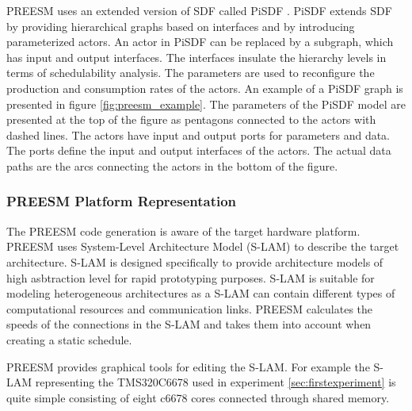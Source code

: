 PREESM uses an extended version of SDF called PiSDF \cite{pelcat2014preesm}. PiSDF extends SDF by providing hierarchical graphs based on interfaces and by introducing parameterized actors. An actor in PiSDF can be replaced by a subgraph, which has input and output interfaces. The interfaces insulate the hierarchy levels in terms of schedulability analysis. The parameters are used to reconfigure the production and consumption rates of the actors. \cite{desnos2013pimm} An example of a PiSDF graph is presented in figure \ref{fig:preesm_example}. The parameters of the PiSDF model are presented at the top of the figure as pentagons connected to the actors with dashed lines. The actors have input and output ports for parameters and data. The ports define the input and output interfaces of the actors. The actual data paths are the arcs connecting the actors in the bottom of the figure.

\subsubsection{PREESM Platform Representation}
The PREESM code generation is aware of the target hardware platform. PREESM uses System-Level Architecture Model (S-LAM) \cite{pelcat2009system} to describe the target architecture. S-LAM is designed specifically to provide architecture models of high asbtraction level for rapid prototyping purposes. S-LAM is suitable for modeling heterogeneous architectures as a S-LAM can contain different types of computational resources and communication links. PREESM calculates the speeds of the connections in the S-LAM and takes them into account when creating a static schedule. \cite{pelcat2009system}

PREESM provides graphical tools for editing the S-LAM. For example the S-LAM representing the TMS320C6678 used in experiment \ref{sec:firstexperiment} is quite simple consisting of eight c6678 cores connected through shared memory.

